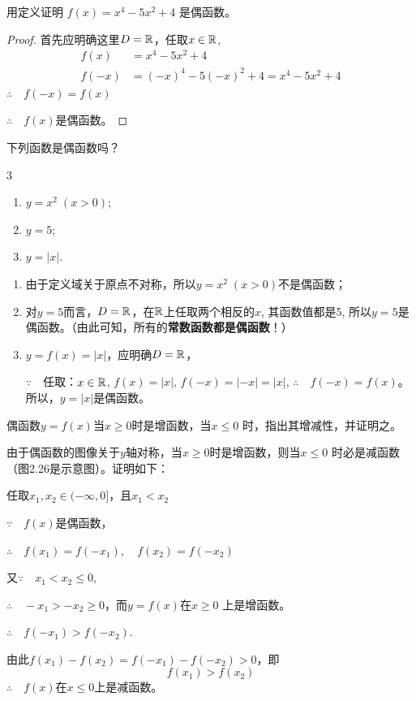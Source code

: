 \begin{example}
    用定义证明
$f(x)=x^4-5x^2+4$
是偶函数。
\end{example}

\begin{proof}
    首先应明确这里$D=\mathbb{R}$，任取$x\in\mathbb{R}$,
\[\begin{split}
    f(x)&=x^4-5x^2+4\\
    f(-x)&=(-x)^4-5(-x)^2+4=x^4-5x^2+4
\end{split}\]
$\therefore\quad f(-x)=f(x)$

$\therefore\quad f(x)$是偶函数。
\end{proof}

\begin{example}
    下列函数是偶函数吗？
\begin{multicols}{3}
\begin{enumerate}[(1)]
    \item $y=x^2\; (x>0)$;
    \item $y=5$;
    \item $y=|x|$.
\end{enumerate}
\end{multicols}
\end{example}

\begin{analyze}
\begin{enumerate}
    \item 由于定义域关于原点不对称，所以$y=x^2\; (x>0)$不是偶函数；
    \item 对$y=5$而言，$D=\mathbb{R}$，在$\mathbb{R}$上任取两个相反的$x$, 其函数值都是5, 所以$y=5$是偶函数。（由此可知，所有的\textbf{常数函数都是偶函数}！）
    \item $y=f(x)=|x|$，应明确$D=\mathbb{R}$，
    
    $\because\quad $任取：$x\in\mathbb{R}$, $f(x)=|x|$, $f(-x)=|-x|=|x|$,
    $\therefore\quad f(-x)=f(x)$。所以，$y=|x|$是偶函数。
\end{enumerate}
\end{analyze}

\begin{example}
    偶函数$y=f(x)$当$x\ge 0$时是增函数，当$x\le 0$
时，指出其增减性，并证明之。
\end{example}

\begin{solution}
    由于偶函数的图像关于$y$轴对称，当$x\ge 0$时是增函数，则当$x\le 0$
时必是减函数（图2.26是示意图）。证明如下：

任取$x_1,x_2\in(-\infty,0]$，且$x_1<x_2$

$\because\quad f(x)$是偶函数，

$\therefore\quad f(x_1)=f(-x_1),\quad f(x_2)=f(-x_2)$

又$\because\quad x_1<x_2\le 0$,

$\therefore\quad -x_1>-x_2\ge 0$，而$y=f(x)$在$x\ge 0$
上是增函数。

$\therefore\quad f(-x_1)>f(-x_2)$.

由此$f(x_1)-f(x_2)=f(-x_1)-f(-x_2)>0$，即
\[f(x_1)>f(x_2)\]
$\therefore\quad f(x)$在$x\le 0$上是减函数。
\end{solution}

